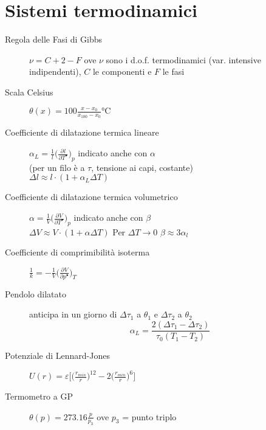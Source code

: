 \documentclass[10pt, oneside]{article}
\begin{document}
\section{Sistemi termodinamici}
\begin{description}
\item[Regola delle Fasi di Gibbs] $\displaystyle \nu = C + 2 - F$ ove $\nu$ sono i d.o.f. termodinamici (var. intensive indipendenti), $C$ le componenti e $F$ le fasi
\item[Scala Celsius] $\displaystyle \theta (x) = 100 \frac{x - x_0}{x_{100} - x_0} \mathrm{°C}$
\item[Coefficiente di dilatazione termica lineare] $\displaystyle \alpha_L = \frac{1}{l} \bigg(\frac{\partial^{} l}{\partial T^{•}}\bigg)_p$ indicato anche con $\alpha$ \\(per un filo è a $\tau$, tensione ai capi, costante)
\\ $\boxed{\displaystyle \Delta l \approx l \cdot (1 + \alpha_L \Delta T)}$
\item[Coefficiente di dilatazione termica volumetrico] $\displaystyle \alpha =  \frac{1}{V} \bigg(\frac{\partial^{} V}{\partial T^{•}}\bigg)_p$ indicato anche con $\beta$
\\ $\boxed{\displaystyle \Delta V \approx V \cdot (1 + \alpha \Delta T)}$ Per $\Delta T \rightarrow 0$ $\beta \approx 3 \alpha_l$
\item[Coefficiente di comprimibilità isoterma] $\displaystyle \frac{1}{k} = -  \frac{1}{V} \bigg(\frac{\partial^{}V}{\partial p^{•}}\bigg)_T$
\item[Pendolo dilatato] anticipa in un giorno di $\Delta \tau_1$ a $\theta_1$ e $\Delta \tau_2$ a $\theta_2$
\[\alpha_L = \frac{2 (\Delta \tau_1 - \Delta \tau_2)}{\tau_0 (T_1 - T_2)}\]
\item[Potenziale di Lennard-Jones] $\displaystyle U(r) = \varepsilon \bigg[\bigg(\frac{r_{min}}{r}\bigg)^{12} - 2 \bigg(\frac{r_{min}}{r}\bigg)^6\bigg]$
\item[Termometro a GP] $\displaystyle \theta(p) = 273.16 \frac{p}{p_3}$ ove $p_3$ = punto triplo
\end{description}
\end{document}
